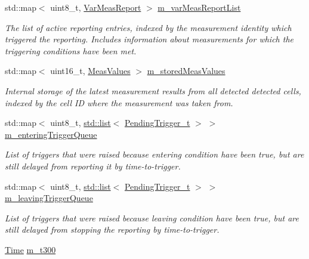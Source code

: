 \begin{DoxyCompactItemize}
std\+::map$<$ uint8\+\_\+t, \hyperlink{structns3_1_1LteUeRrc_1_1VarMeasReport}{Var\+Meas\+Report} $>$ \hyperlink{classns3_1_1LteUeRrc_a82da3c138c967761910c02b83724a0e4}{m\+\_\+var\+Meas\+Report\+List}
\begin{DoxyCompactList}\small\item\em The list of active reporting entries, indexed by the measurement identity which triggered the reporting. Includes information about measurements for which the triggering conditions have been met. \end{DoxyCompactList}\item 
std\+::map$<$ uint16\+\_\+t, \hyperlink{structns3_1_1LteUeRrc_1_1MeasValues}{Meas\+Values} $>$ \hyperlink{classns3_1_1LteUeRrc_a93094dcd5c235b2e2a8a299125100a57}{m\+\_\+stored\+Meas\+Values}
\begin{DoxyCompactList}\small\item\em Internal storage of the latest measurement results from all detected detected cells, indexed by the cell ID where the measurement was taken from. \end{DoxyCompactList}\item 
std\+::map$<$ uint8\+\_\+t, \hyperlink{openflow-interface_8h_afd9bcfa176617760671b67580f536fa7}{std\+::list}$<$ \hyperlink{structns3_1_1LteUeRrc_1_1PendingTrigger__t}{Pending\+Trigger\+\_\+t} $>$ $>$ \hyperlink{classns3_1_1LteUeRrc_a06a26d8b08a9c635d7fa6ff8381fff4f}{m\+\_\+entering\+Trigger\+Queue}
\begin{DoxyCompactList}\small\item\em List of triggers that were raised because entering condition have been true, but are still delayed from reporting it by time-\/to-\/trigger. \end{DoxyCompactList}\item 
std\+::map$<$ uint8\+\_\+t, \hyperlink{openflow-interface_8h_afd9bcfa176617760671b67580f536fa7}{std\+::list}$<$ \hyperlink{structns3_1_1LteUeRrc_1_1PendingTrigger__t}{Pending\+Trigger\+\_\+t} $>$ $>$ \hyperlink{classns3_1_1LteUeRrc_a7984d05cbcc51cd9239a22bd7e400d06}{m\+\_\+leaving\+Trigger\+Queue}
\begin{DoxyCompactList}\small\item\em List of triggers that were raised because leaving condition have been true, but are still delayed from stopping the reporting by time-\/to-\/trigger. \end{DoxyCompactList}\item 
\hyperlink{classns3_1_1Time}{Time} \hyperlink{classns3_1_1LteUeRrc_ab69b12ce9b9d4088e626dbca0a21bc0a}{m\+\_\+t300}

\end{DoxyCompactItemize}

